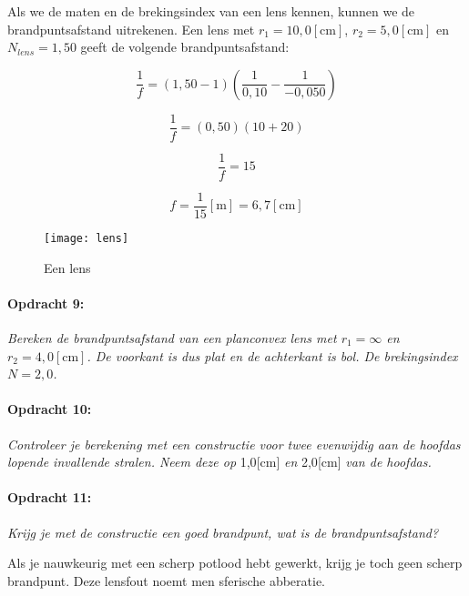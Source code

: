 Als we de maten en de brekingsindex van een lens kennen, kunnen we
de brandpuntsafstand uitrekenen. Een lens met $r_{1}=10,0[\mathrm{cm}]$,
$r_{2}=5,0[\mathrm{cm}]$ en $N_{lens}=1,50$ geeft de volgende brandpuntsafstand:

\[
\frac{1}{f}=(1,50-1)(\frac{1}{0,10}-\frac{1}{-0,050})
\]


\[
\frac{1}{f}=(0,50)(10+20)
\]


\[
\frac{1}{f}=15
\]


\[
f=\frac{1}{15}[\mathrm{m}]=6,7\mathrm{[cm]}
\]


\begin{figure}[H]
\noindent \begin{centering}
\texttt{[image: lens]}
\par\end{centering}

\caption{Een lens}
\end{figure}



\paragraph*{Opdracht 9:}

\emph{Bereken de brandpuntsafstand van een planconvex lens met $r_{1}=\infty$
en $r_{2}=4,0[\mathrm{cm}]$. De voorkant is dus plat en de achterkant
is bol. De brekingsindex $N=2,0$.}


\paragraph*{Opdracht 10:}

\emph{Controleer je berekening met een constructie voor twee evenwijdig
aan de hoofdas lopende invallende stralen. Neem deze op }1,0{[}cm{]}\emph{
en }2,0{[}cm{]}\emph{ van de hoofdas.}


\paragraph*{Opdracht 11:}

\emph{Krijg je met de constructie een goed brandpunt, wat is de brandpuntsafstand?}

Als je nauwkeurig met een scherp potlood hebt gewerkt, krijg je toch
geen scherp brandpunt. Deze lensfout noemt men sferische abberatie.


